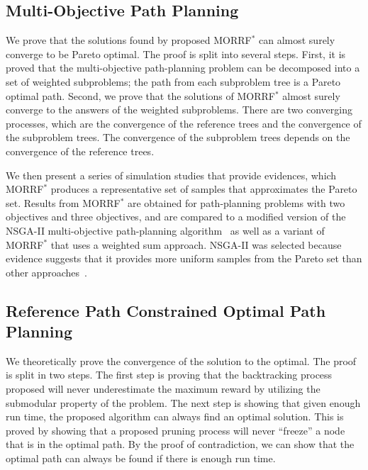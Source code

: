 \documentclass[phd]{byuprop}
\begin{document}
\subsection{Multi-Objective Path Planning}
\label{sec:validation:multi_objective_path_planning}

We prove that the solutions found by proposed MORRF$^{*}$ can almost surely converge to be Pareto optimal.
The proof is split into several steps.
First, it is proved that the multi-objective path-planning problem can be decomposed into a set of weighted subproblems;
the path from each subproblem tree is a Pareto optimal path.
Second, we prove that the solutions of MORRF$^{*}$ almost surely converge to the answers of the weighted subproblems.
There are two converging processes, which are the convergence of the reference trees and the convergence of the subproblem trees.
The convergence of the subproblem trees depends on the convergence of the reference trees.

We then present a series of simulation studies that provide evidences, which MORRF$^{*}$ produces a representative set of samples that approximates the Pareto set.
Results from MORRF$^{*}$ are obtained for path-planning problems with two objectives and three objectives, and are compared to a modified version of the NSGA-II multi-objective path-planning algorithm~\cite{Ahmed2013} as well as a variant of MORRF$^{*}$ that uses a weighted sum approach.
NSGA-II was selected because evidence suggests that it provides more uniform samples from the Pareto set than other approaches~\cite{Deb2002}.

\subsection{Reference Path Constrained Optimal Path Planning}
\label{sec:validation:reference_path_constrained_optimal_path_planning}

We theoretically prove the convergence of the solution to the optimal.
The proof is split in two steps.
The first step is proving that the backtracking process proposed will never underestimate the maximum reward by utilizing the submodular property of the problem.
The next step is showing that given enough run time, the proposed algorithm can always find an optimal solution.
This is proved by showing that a proposed pruning process will never ``freeze'' a node that is in the optimal path.
By the proof of contradiction, we can show that the optimal path can always be found if there is enough run time.
\end{document}
